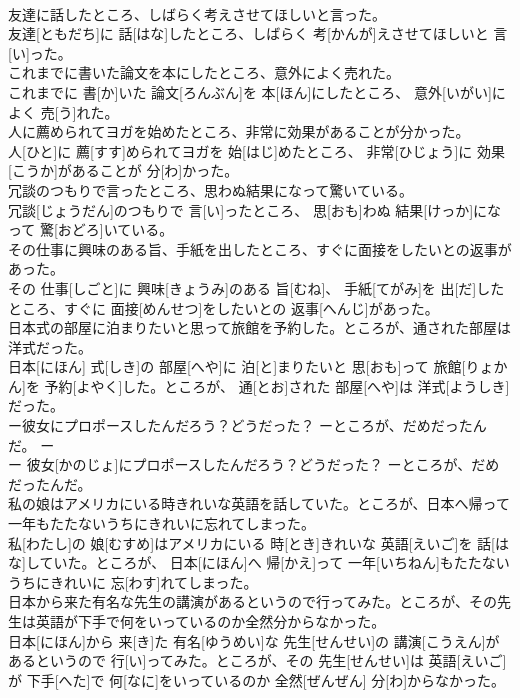 \documentclass[8pt]{extreport}
\begin{document}
\begin{CJK}{UTF8}{min}
\\	友達に話したところ、しばらく考えさせてほしいと言った。	
\\	友達[ともだち]に 話[はな]したところ、しばらく 考[かんが]えさせてほしいと 言[い]った。
\\	これまでに書いた論文を本にしたところ、意外によく売れた。	
\\	これまでに 書[か]いた 論文[ろんぶん]を 本[ほん]にしたところ、 意外[いがい]によく 売[う]れた。
\\	人に薦められてヨガを始めたところ、非常に効果があることが分かった。	
\\	人[ひと]に 薦[すす]められてヨガを 始[はじ]めたところ、 非常[ひじょう]に 効果[こうか]があることが 分[わ]かった。
\\	冗談のつもりで言ったところ、思わぬ結果になって驚いている。	
\\	冗談[じょうだん]のつもりで 言[い]ったところ、 思[おも]わぬ 結果[けっか]になって 驚[おどろ]いている。
\\	その仕事に興味のある旨、手紙を出したところ、すぐに面接をしたいとの返事があった。	
\\	その 仕事[しごと]に 興味[きょうみ]のある 旨[むね]、 手紙[てがみ]を 出[だ]したところ、すぐに 面接[めんせつ]をしたいとの 返事[へんじ]があった。
\\	日本式の部屋に泊まりたいと思って旅館を予約した。ところが、通された部屋は洋式だった。	
\\	日本[にほん] 式[しき]の 部屋[へや]に 泊[と]まりたいと 思[おも]って 旅館[りょかん]を 予約[よやく]した。ところが、 通[とお]された 部屋[へや]は 洋式[ようしき]だった。
\\	ー彼女にプロポースしたんだろう？どうだった？ ーところが、だめだったんだ。	ー
\\	ー 彼女[かのじょ]にプロポースしたんだろう？どうだった？ ーところが、だめだったんだ。
\\	私の娘はアメリカにいる時きれいな英語を話していた。ところが、日本へ帰って一年もたたないうちにきれいに忘れてしまった。	
\\	私[わたし]の 娘[むすめ]はアメリカにいる 時[とき]きれいな 英語[えいご]を 話[はな]していた。ところが、 日本[にほん]へ 帰[かえ]って 一年[いちねん]もたたないうちにきれいに 忘[わす]れてしまった。
\\	日本から来た有名な先生の講演があるというので行ってみた。ところが、その先生は英語が下手で何をいっているのか全然分からなかった。	
\\	日本[にほん]から 来[き]た 有名[ゆうめい]な 先生[せんせい]の 講演[こうえん]があるというので 行[い]ってみた。ところが、その 先生[せんせい]は 英語[えいご]が 下手[へた]で 何[なに]をいっているのか 全然[ぜんぜん] 分[わ]からなかった。

\end{CJK}
\end{document}
